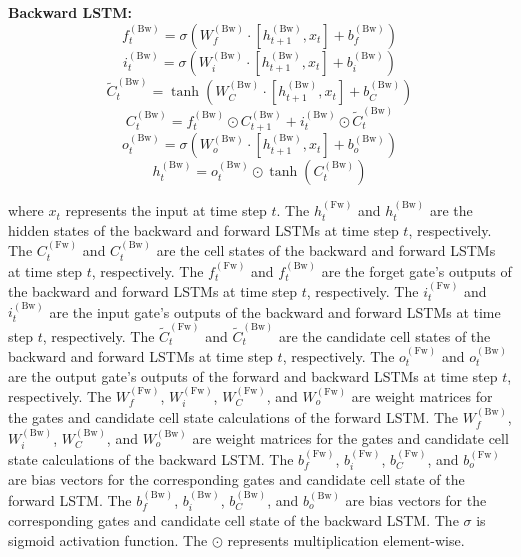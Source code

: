 \documentclass[sn-mathphys,Numbered]{sn-jnl}
\theoremstyle{thmstyleone}
\theoremstyle{thmstyletwo}
\theoremstyle{thmstylethree}
\begin{document}
\textbf{Backward LSTM:}
\begin{equation}
f_t^{(\text{Bw})} = \sigma(W_{f}^{(\text{Bw})} \cdot [h_{t+1}^{(\text{Bw})}, x_t] + b_{f}^{(\text{Bw})})
\end{equation}
\begin{equation}
i_t^{(\text{Bw})} = \sigma(W_{i}^{(\text{Bw})} \cdot [h_{t+1}^{(\text{Bw})}, x_t] + b_{i}^{(\text{Bw})})
\end{equation}
\begin{equation}
\tilde{C}_t^{(\text{Bw})} = \tanh(W_{C}^{(\text{Bw})} \cdot [h_{t+1}^{(\text{Bw})}, x_t] + b_{C}^{(\text{Bw})})
\end{equation}
\begin{equation}
C_t^{(\text{Bw})} = f_t^{(\text{Bw})} \odot C_{t+1}^{(\text{Bw})} + i_t^{(\text{Bw})} \odot \tilde{C}_t^{(\text{Bw})}
\end{equation}
\begin{equation}
o_t^{(\text{Bw})} = \sigma(W_{o}^{(\text{Bw})} \cdot [h_{t+1}^{(\text{Bw})}, x_t] + b_{o}^{(\text{Bw})})
\end{equation}
\begin{equation}
h_t^{(\text{Bw})} = o_t^{(\text{Bw})} \odot \tanh(C_t^{(\text{Bw})})
\end{equation}

where \(x_t\) represents the input at time step \(t\). The
\(h_t^{(\text{Fw})}\) and \(h_t^{(\text{Bw})}\) are the hidden states of the backward and forward LSTMs at time step \(t\), respectively. The
\(C_t^{(\text{Fw})}\) and \(C_t^{(\text{Bw})}\) are the cell states of the backward and forward LSTMs at time step \(t\), respectively. The
\(f_t^{(\text{Fw})}\) and \(f_t^{(\text{Bw})}\) are the forget gate's outputs of the backward and forward LSTMs at time step \(t\), respectively. The
\(i_t^{(\text{Fw})}\) and \(i_t^{(\text{Bw})}\) are the input gate's outputs of the backward and forward LSTMs at time step \(t\), respectively. The
\(\tilde{C}_t^{(\text{Fw})}\) and \(\tilde{C}_t^{(\text{Bw})}\) are the candidate cell states of the backward and forward LSTMs at time step \(t\), respectively. The
\(o_t^{(\text{Fw})}\) and \(o_t^{(\text{Bw})}\) are the output gate's outputs of the forward and backward LSTMs at time step \(t\), respectively. The
\(W_{f}^{(\text{Fw})}\), \(W_{i}^{(\text{Fw})}\), \(W_{C}^{(\text{Fw})}\), and \(W_{o}^{(\text{Fw})}\) are weight matrices for the gates and candidate cell state calculations of the forward LSTM. The
\(W_{f}^{(\text{Bw})}\), \(W_{i}^{(\text{Bw})}\), \(W_{C}^{(\text{Bw})}\), and \(W_{o}^{(\text{Bw})}\) are weight matrices for the gates and candidate cell state calculations of the backward LSTM. The
\(b_{f}^{(\text{Fw})}\), \(b_{i}^{(\text{Fw})}\), \(b_{C}^{(\text{Fw})}\), and \(b_{o}^{(\text{Fw})}\) are bias vectors for the corresponding gates and candidate cell state of the forward LSTM. The
\(b_{f}^{(\text{Bw})}\), \(b_{i}^{(\text{Bw})}\), \(b_{C}^{(\text{Bw})}\), and \(b_{o}^{(\text{Bw})}\) are bias vectors for the corresponding gates and candidate cell state of the backward LSTM. The
\(\sigma\) is sigmoid activation function. The
\(\odot\) represents multiplication element-wise.
\end{document}
